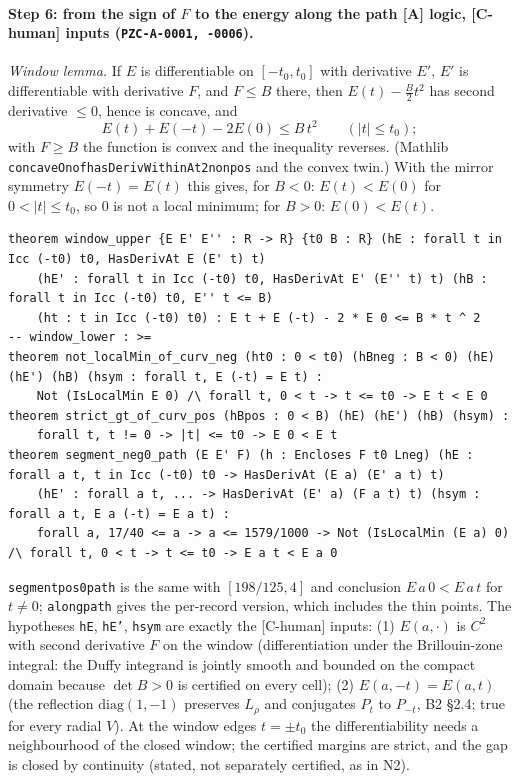 \documentclass[10pt]{article}
\newcommand{\tier}[1]{\textsf{[#1]}}
\newcommand{\tA}{\tier{A}}
\newcommand{\tCh}{\tier{C-human}}
\newcommand{\lean}[1]{\texttt{#1}}
\renewcommand{\_}{\textunderscore\penalty0\hspace{0pt}}
\begin{document}
\paragraph{Step 6: from the sign of $F$ to the energy along the path \tA{} logic, \tCh{} inputs (\texttt{PZC-A-0001, -0006}).} \emph{Window lemma.} If $E$ is differentiable on $[-t_0,t_0]$ with derivative $E'$, $E'$ is differentiable with derivative $F$, and $F\le B$ there, then $E(t)-\tfrac B2t^2$ has second derivative $\le0$, hence is concave, and
\[E(t)+E(-t)-2E(0)\le B\,t^2\qquad(|t|\le t_0);\]
with $F\ge B$ the function is convex and the inequality reverses. (Mathlib \lean{concaveOn\_of\_hasDerivWithinAt2\_nonpos} and the convex twin.) With the mirror symmetry $E(-t)=E(t)$ this gives, for $B<0$: $E(t)<E(0)$ for $0<|t|\le t_0$, so $0$ is not a local minimum; for $B>0$: $E(0)<E(t)$.
\begin{lstlisting}
theorem window_upper {E E' E'' : R -> R} {t0 B : R} (hE : forall t in Icc (-t0) t0, HasDerivAt E (E' t) t)
    (hE' : forall t in Icc (-t0) t0, HasDerivAt E' (E'' t) t) (hB : forall t in Icc (-t0) t0, E'' t <= B)
    (ht : t in Icc (-t0) t0) : E t + E (-t) - 2 * E 0 <= B * t ^ 2      -- window_lower : >=
theorem not_localMin_of_curv_neg (ht0 : 0 < t0) (hBneg : B < 0) (hE) (hE') (hB) (hsym : forall t, E (-t) = E t) :
    Not (IsLocalMin E 0) /\ forall t, 0 < t -> t <= t0 -> E t < E 0
theorem strict_gt_of_curv_pos (hBpos : 0 < B) (hE) (hE') (hB) (hsym) :
    forall t, t != 0 -> |t| <= t0 -> E 0 < E t
theorem segment_neg0_path (E E' F) (h : Encloses F t0 Lneg) (hE : forall a t, t in Icc (-t0) t0 -> HasDerivAt (E a) (E' a t) t)
    (hE' : forall a t, ... -> HasDerivAt (E' a) (F a t) t) (hsym : forall a t, E a (-t) = E a t) :
    forall a, 17/40 <= a -> a <= 1579/1000 -> Not (IsLocalMin (E a) 0) /\ forall t, 0 < t -> t <= t0 -> E a t < E a 0
\end{lstlisting}
\lean{segment\_pos0\_path} is the same with $[198/125,4]$ and conclusion $E\,a\,0<E\,a\,t$ for $t\ne0$; \lean{along\_path} gives the per-record version, which includes the thin points. The hypotheses \lean{hE}, \lean{hE'}, \lean{hsym} are exactly the \tCh{} inputs:
(1) $E(a,\cdot)$ is $C^2$ with second derivative $F$ on the window (differentiation under the Brillouin-zone integral: the Duffy integrand is jointly smooth and bounded on the compact domain because $\det B>0$ is certified on every cell); (2) $E(a,-t)=E(a,t)$ (the reflection $\mathrm{diag}(1,-1)$ preserves $L_\rho$ and conjugates $P_t$ to $P_{-t}$, B2 \S2.4; true for every radial $V$).
At the window edges $t=\pm t_0$ the differentiability needs a neighbourhood of the closed window; the certified margins are strict, and the gap is closed by continuity (stated, not separately certified, as in N2).
\end{document}
